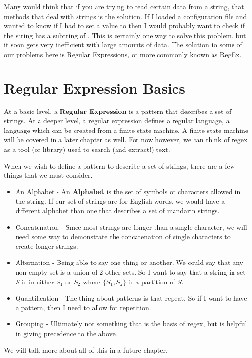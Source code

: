 \documentclass[main.tex]{subfiles}
\begin{document}
Many would think that if you are trying to read certain data from a string, that methods that deal with strings is the solution.
If I loaded a configuration file and wanted to know if I had to set a value to  then I would probably want to check if the string has a subtring of .
This is certainly one way to solve this problem, but it soon gets very inefficient with large amounts of data. 
The solution to some of our problems here is Regular Expressions, or more commonly known as RegEx.

\section{Regular Expression Basics}
At a basic level, a \textbf{Regular Expression} is a pattern that describes a set of strings. 
At a deeper level, a regular expression defines a regular language, a language which can be created from a finite state machine. 
A finite state machine will be covered in a later chapter as well.
For now however, we can think of regex as a tool (or library) used to search (and extract!) text. 

When we wish to define a pattern to describe a set of strings, there are a few things that we must consider. 
\begin{itemize}
    \item An Alphabet - An \textbf{Alphabet} is the set of symbols or characters allowed in the string. 
If our set of strings are for English words, we would have a different alphabet than one that describes a set of mandarin strings.
\item Concatenation - Since most strings are longer than a single character, we will need some way to demonstrate the concatenation of single characters to create longer strings.
\item Alternation - Being able to say one thing or another. We could say that any non-empty set is a union of 2 other sets. So I want to say that a string in set $S$ is in either $S_1$ or $S_2$ where $\{S_1,S_2\}$ is a partition of $S$.
\item Quantification - The thing about patterns is that repeat. So if I want to have a pattern, then I need to allow for repetition. 
\item Grouping - Ultimately not something that is the basis of regex, but is helpful in giving precedence to the above.
\end{itemize}

We will talk more about all of this in a future chapter. 
\end{document}
